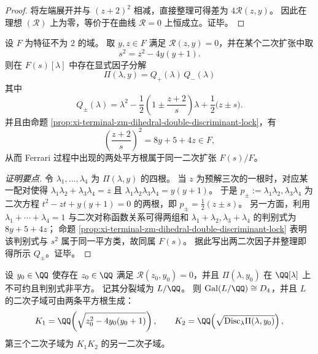 \begin{proof}
将左端展开并与 \((z+2)^2\) 相减，直接整理可得差为 \(4\mathscr R(z,y)\)。
因此在理想 \((\mathscr R)\) 上为零，等价于在曲线 \(\mathscr R=0\) 上恒成立。证毕。
\end{proof}

\begin{corollary}\label{cor:xi-terminal-zm-dihedral-ferrari-single-quadratic-closure}
设 \(F\) 为特征不为 \(2\) 的域。
取 \(y,z\in F\) 满足 \(\mathscr R(z,y)=0\)，并在某个二次扩张中取
\[
s^2=z^2-4y(y+1).
\]
则在 \(F(s)[\lambda]\) 中存在显式因子分解
\[
\boxed{\;
\Pi(\lambda,y)=Q_{+}(\lambda)\,Q_{-}(\lambda)\;}
\]
其中
\[
Q_{\pm}(\lambda)=
\lambda^2-\frac12\left(1\pm\frac{z+2}{s}\right)\lambda+\frac12\bigl(z\pm s\bigr).
\]
并且由命题 \ref{prop:xi-terminal-zm-dihedral-double-discriminant-lock}，有
\[
\left(\frac{z+2}{s}\right)^2=8y+5+4z\in F,
\]
从而 Ferrari 过程中出现的两处平方根属于同一二次扩张 \(F(s)/F\)。
\end{corollary}

\begin{proof}[证明要点]
令 \(\lambda_1,\dots,\lambda_4\) 为 \(\Pi(\lambda,y)\) 的四根。
当 \(z\) 为预解三次的一根时，对应某一配对使得
\(
\lambda_1\lambda_2+\lambda_3\lambda_4=z
\)
且
\(
\lambda_1\lambda_2\lambda_3\lambda_4=y(y+1)
\)。
于是 \(p_{\pm}:=\lambda_1\lambda_2,\lambda_3\lambda_4\) 为二次方程 \(t^2-zt+y(y+1)=0\) 的两根，即 \(p_{\pm}=\frac12(z\pm s)\)。
另一方面，利用 \(\lambda_1+\cdots+\lambda_4=1\) 与二次对称函数关系可得两组和 \(\lambda_1+\lambda_2,\lambda_3+\lambda_4\) 的判别式为 \(8y+5+4z\)；
命题 \ref{prop:xi-terminal-zm-dihedral-double-discriminant-lock} 表明该判别式与 \(s^2\) 属于同一平方类，故同属 \(F(s)\)。
据此写出两二次因子并整理即得所示 \(Q_\pm\)。证毕。
\end{proof}

\begin{proposition}\label{prop:xi-terminal-zm-dihedral-d4-quadratic-subfields}
设 \(y_0\in\QQ\) 使存在 \(z_0\in\QQ\) 满足 \(\mathscr R(z_0,y_0)=0\)，并且 \(\Pi(\lambda,y_0)\) 在 \(\QQ[\lambda]\) 上不可约且判别式非平方。
记其分裂域为 \(L/\QQ\)。
则 \(\mathrm{Gal}(L/\QQ)\cong D_4\)，并且 \(L\) 的二次子域可由两条平方根生成：
\[
K_1=\QQ\!\left(\sqrt{z_0^2-4y_0(y_0+1)}\right),
\qquad
K_2=\QQ\!\left(\sqrt{\mathrm{Disc}_\lambda\Pi(\lambda,y_0)}\right),
\]
第三个二次子域为 \(K_1K_2\) 的另一二次子域。
\end{proposition}

